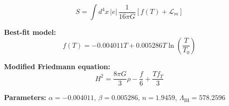
\begin{equation}
  S = \int d^4x \, |e| \, \frac{1}{16\pi G} \left[ f(T) + \mathcal{L}_m \right]
\end{equation}

\textbf{Best-fit model:}
\begin{equation}
  f(T) = -0.004011 T + 0.005286 T \ln\!\left(\frac{T}{T_0}\right)
\end{equation}

\textbf{Modified Friedmann equation:}
\begin{equation}
  H^2 = \frac{8\pi G}{3} \rho - \frac{f}{6} + \frac{T f_T}{3}
\end{equation}

\textbf{Parameters:}
$\alpha = -0.004011$, \quad
$\beta = 0.005286$, \quad
$n = 1.9459$, \quad
$\Lambda_{\text{BI}} = 578.2596$